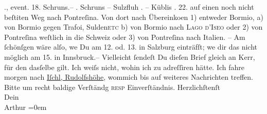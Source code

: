 \begin{ledgroupsized}[t]{13cm}
           ., event. 18. Schruns.–\pend
           . Schruns – Sulzfluh\pend
           . \hspace*{4.5em}– Küblis\pend
           . 22. auf einen noch nicht beſti{\geminationm}ten Weg nach Pontreſina. \pend
           \pstart
           Von dort nach Übereinko{\geminationm}en \introOben{}1)\introOben{}
               entweder Bormio, \introOben{}a)\introOben{}
               von Bormio gegen Trafoi, Sulden\textsc{etc} b) von Bormio
               nach \textsc{Lago d’Iseo} oder 2) von Pontreſina weſtlich in die
                  Schweiz oder 3) von Pontreſina nach Italien. – Am ſchönſgen wäre alſo, we{\geminationn} Du am 12. od. 13. in Salzburg einträfſt; we{\geminationn} dir das nicht möglich
               am 15. in Innsbruck.– \pend
           \pstart
           Vielleicht ſendeſt Du dieſen Brief gleich an Kerr, für den dasſelbe gilt. Ich weiſs nicht, wohin ich zu adreſſiren hätte.
                  {\pb}\pend
           \pstart
           Ich fahre morgen nach \uline{Iſchl, Rudolfshöhe}, wommich bis auf weiteres Nachrichten treffen. Bitte um recht baldige Verſtändg
                  \textsc{resp} Einverſtändnis.\pend
           \pstart
           Herzlichſtenſt{\\[\baselineskip]}Dein{\\[\baselineskip]}\spacefill\mbox{Arthur}\pend
           \leftskip=0em{}
         
         \endnumbering{}\end{ledgroupsized}\begin{anhang}\end{anhang}\newcommand{\dateiname}{L03176}\newcommand{\titel}{Arthur Schnitzler an Paul Goldmann, 30. 7. 1900}\newcommand{\editorInnen}{Martin Anton Müller und Laura Untner}
      